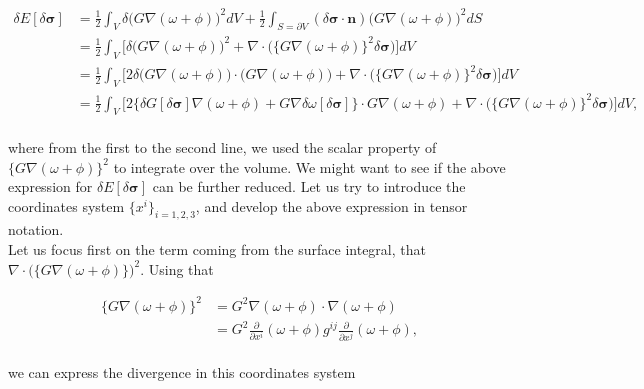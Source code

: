 \documentclass[aps,prc,floatfix,showkeys,nofootinbib]{revtex4-1}
\newcommand{\beq}{\begin{equation}}
\newcommand{\eeq}{\end{equation}}
\newcommand{\Div}{\nabla\cdot}
\newcommand{\grad}{\nabla}
\begin{document}
\beq
\begin{split}
\delta E [\delta \bm{\sigma}] &= \frac{1}{2}\int_V \delta \Big(G\grad (\omega + \phi)\Big)^2dV + \frac{1}{2}\int_{S=\partial V}(\delta \bm{\sigma}\cdot \bm{n}) \Big(G\grad (\omega + \phi)\Big)^2 dS\\
&= \frac{1}{2}\int_V\Bigg[\delta \Big(G\grad (\omega + \phi)\Big)^2 + \Div \Big(\{G\grad (\omega + \phi)\}^2 \delta \bm{\sigma}\Big)\Bigg]dV\\
&= \frac{1}{2}\int_V\Bigg[  2 \delta\Big(G\grad (\omega + \phi)\Big) \cdot \Big(G\grad (\omega + \phi)\Big) + \Div \Big(\{G\grad (\omega + \phi)\}^2 \delta \bm{\sigma}\Big)\Bigg]dV\\
&= \frac{1}{2}\int_V \Bigg[ 2 \Big\{\delta G [ \delta \bm{\sigma}]\nabla(\omega + \phi) + G\nabla\delta \omega [\delta \bm{\sigma}]\Big\}\cdot G \nabla(\omega + \phi) + \Div \Big(\{G\grad (\omega + \phi)\}^2 \delta \bm{\sigma}\Big)\Bigg] dV,
\end{split}\label{deltaE}
\eeq\\

\noindent where from the first to the second line, we used the scalar property of $\{G\grad (\omega + \phi)\}^2$ to integrate over the volume. We might want to see if the above expression for $\delta E [\delta \bm{\sigma}]$ can be further reduced. Let us try to introduce the coordinates system $\{x^{i}\}_{i=1,2,3}$, and develop the above expression in tensor notation.\\
 

\newpage
Let us focus first on the term coming from the surface integral, that $\Div \Big(\{G\grad (\omega + \phi)\}\Big)^2 $. Using that 

\beq
\begin{split}
\{G\grad (\omega + \phi)\}^2 &= G^2 \nabla( \omega + \phi) \cdot \nabla(\omega+\phi)\\
&= G^2 \frac{\partial}{\partial x^{i}}(\omega + \phi)g^{ij}\frac{\partial}{\partial x^{j}}(\omega + \phi),
\end{split}
\eeq\\

\noindent we can express the divergence in this coordinates system
\end{document}
